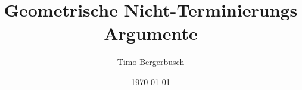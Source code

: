 \documentclass{beamer}
\title{Geometrische Nicht-Terminierungs Argumente}
\author{Timo Bergerbusch}
\date{\today}
\begin{document}
\maketitle
\frame{\tableofcontents}






\end{document}
